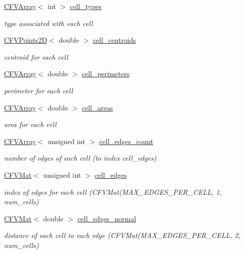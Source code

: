 \begin{DoxyCompactItemize}
\hyperlink{classFVL_1_1CFVArray}{CFVArray}$<$ int $>$ \hyperlink{classFVL_1_1CFVMesh2D_a373a520b2d4015b9602a58759dcd39cd}{cell\_\-types}
\begin{DoxyCompactList}\small\item\em type associated with each cell \item\end{DoxyCompactList}\item 
\hyperlink{classFVL_1_1CFVPoints2D}{CFVPoints2D}$<$ double $>$ \hyperlink{classFVL_1_1CFVMesh2D_a63792291626ccfe6bdf93b3904a8320b}{cell\_\-centroids}
\begin{DoxyCompactList}\small\item\em centroid for each cell \item\end{DoxyCompactList}\item 
\hyperlink{classFVL_1_1CFVArray}{CFVArray}$<$ double $>$ \hyperlink{classFVL_1_1CFVMesh2D_a9b0f6ae0e30a2b7dedfeba13d4590fe3}{cell\_\-perimeters}
\begin{DoxyCompactList}\small\item\em perimeter for each cell \item\end{DoxyCompactList}\item 
\hyperlink{classFVL_1_1CFVArray}{CFVArray}$<$ double $>$ \hyperlink{classFVL_1_1CFVMesh2D_a012b4e69e4350c5c1e61394ba875f8d4}{cell\_\-areas}
\begin{DoxyCompactList}\small\item\em area for each cell \item\end{DoxyCompactList}\item 
\hyperlink{classFVL_1_1CFVArray}{CFVArray}$<$ unsigned int $>$ \hyperlink{classFVL_1_1CFVMesh2D_ac40c328fe38b4afc77363050e278bcce}{cell\_\-edges\_\-count}
\begin{DoxyCompactList}\small\item\em number of edges of each cell (to index cell\_\-edges) \item\end{DoxyCompactList}\item 
\hyperlink{classFVL_1_1CFVMat}{CFVMat}$<$ unsigned int $>$ \hyperlink{classFVL_1_1CFVMesh2D_a088a198cb26befce9c0f1cab67e00705}{cell\_\-edges}
\begin{DoxyCompactList}\small\item\em index of edges for each cell (CFVMat(MAX\_\-EDGES\_\-PER\_\-CELL, 1, num\_\-cells) \item\end{DoxyCompactList}\item 
\hyperlink{classFVL_1_1CFVMat}{CFVMat}$<$ double $>$ \hyperlink{classFVL_1_1CFVMesh2D_a1dc398446290133710b75ca776d4abda}{cell\_\-edges\_\-normal}
\begin{DoxyCompactList}\small\item\em distance of each cell to each edge (CFVMat(MAX\_\-EDGES\_\-PER\_\-CELL, 2, num\_\-cells) \item\end{DoxyCompactList}\end{DoxyCompactItemize}


